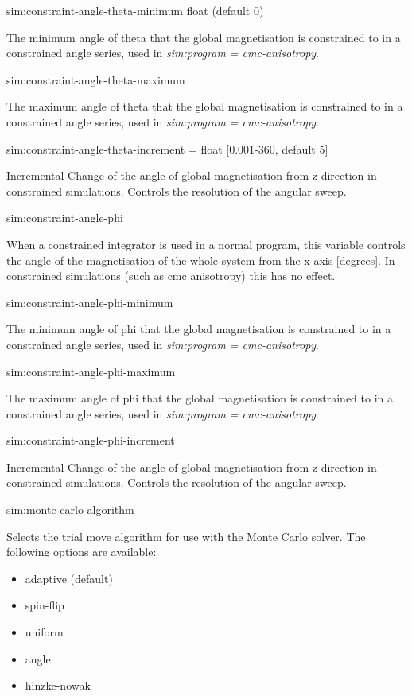 {\zicf  sim:constraint-angle-theta-minimum float (default 0)}   The minimum angle of theta that the global magnetisation is constrained to in a constrained angle series, used in \textit{sim:program = cmc-anisotropy}.

{\zicf  sim:constraint-angle-theta-maximum} The maximum angle of theta that the global magnetisation is constrained to in a constrained angle series, used in \textit{sim:program = cmc-anisotropy}.

{\zicf  sim:constraint-angle-theta-increment = float [0.001-360, default 5]} Incremental Change of the angle of global magnetisation from z-direction in constrained simulations. Controls the resolution of the angular sweep.

{\zicf sim:constraint-angle-phi} When a constrained integrator is used in a normal program, this variable controls the angle of the magnetisation of the whole system from the x-axis [degrees]. In constrained simulations (such as cmc anisotropy) this has no effect.

{\zicf sim:constraint-angle-phi-minimum} The minimum angle of phi that the global magnetisation is constrained to in a constrained angle series, used in \textit{sim:program = cmc-anisotropy}.

{\zicf sim:constraint-angle-phi-maximum} The maximum angle of phi that the global magnetisation is constrained to in a constrained angle series, used in \textit{sim:program = cmc-anisotropy}.

{\zicf sim:constraint-angle-phi-increment} Incremental Change of the angle of global magnetisation from z-direction in constrained simulations. Controls the resolution of the angular sweep.

{\zicf sim:monte-carlo-algorithm} Selects the trial move algorithm for use with the Monte Carlo solver. The following options are available:

\begin{itemize}
  \item[] adaptive (default)
  \item[] spin-flip
  \item[] uniform
  \item[] angle
  \item[] hinzke-nowak
\end{itemize}

